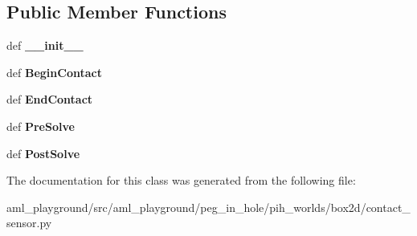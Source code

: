 \subsection*{Public Member Functions}
\begin{DoxyCompactItemize}
\item 
\hypertarget{classaml__playground_1_1peg__in__hole_1_1pih__worlds_1_1box2d_1_1contact__sensor_1_1_contact_sensor_af693238a1ccd886110187c74ad1df132}{def {\bfseries \-\_\-\-\_\-init\-\_\-\-\_\-}}\label{classaml__playground_1_1peg__in__hole_1_1pih__worlds_1_1box2d_1_1contact__sensor_1_1_contact_sensor_af693238a1ccd886110187c74ad1df132}

\item 
\hypertarget{classaml__playground_1_1peg__in__hole_1_1pih__worlds_1_1box2d_1_1contact__sensor_1_1_contact_sensor_a290b9a004dda8fb1044af9eefcc34d69}{def {\bfseries Begin\-Contact}}\label{classaml__playground_1_1peg__in__hole_1_1pih__worlds_1_1box2d_1_1contact__sensor_1_1_contact_sensor_a290b9a004dda8fb1044af9eefcc34d69}

\item 
\hypertarget{classaml__playground_1_1peg__in__hole_1_1pih__worlds_1_1box2d_1_1contact__sensor_1_1_contact_sensor_ae2311ba111f9b48175c7b556d76261ff}{def {\bfseries End\-Contact}}\label{classaml__playground_1_1peg__in__hole_1_1pih__worlds_1_1box2d_1_1contact__sensor_1_1_contact_sensor_ae2311ba111f9b48175c7b556d76261ff}

\item 
\hypertarget{classaml__playground_1_1peg__in__hole_1_1pih__worlds_1_1box2d_1_1contact__sensor_1_1_contact_sensor_a4e605c87133784b15e083e5f08ec0393}{def {\bfseries Pre\-Solve}}\label{classaml__playground_1_1peg__in__hole_1_1pih__worlds_1_1box2d_1_1contact__sensor_1_1_contact_sensor_a4e605c87133784b15e083e5f08ec0393}

\item 
\hypertarget{classaml__playground_1_1peg__in__hole_1_1pih__worlds_1_1box2d_1_1contact__sensor_1_1_contact_sensor_a11598abb4d1f6cfed6fc742ac3c1c59f}{def {\bfseries Post\-Solve}}\label{classaml__playground_1_1peg__in__hole_1_1pih__worlds_1_1box2d_1_1contact__sensor_1_1_contact_sensor_a11598abb4d1f6cfed6fc742ac3c1c59f}

\end{DoxyCompactItemize}


The documentation for this class was generated from the following file\-:\begin{DoxyCompactItemize}
\item 
aml\-\_\-playground/src/aml\-\_\-playground/peg\-\_\-in\-\_\-hole/pih\-\_\-worlds/box2d/contact\-\_\-sensor.\-py\end{DoxyCompactItemize}
